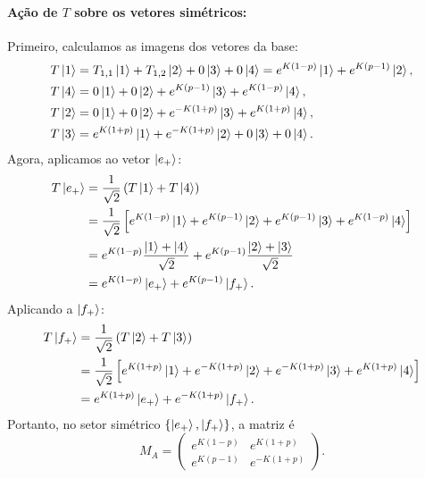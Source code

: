 \documentclass[11pt,a4paper]{article}
\begin{document}
\paragraph{Ação de \(T\) sobre os vetores simétricos:}
%
Primeiro, calculamos as imagens dos vetores da base:
%
\begin{align}
    T\ket{1} &= T_{1,1}\ket{1} + T_{1,2}\ket{2} + 0\ket{3} + 0\ket{4}
    = e^{K(1-p)}\ket{1} + e^{K(p-1)}\ket{2}, \\
    T\ket{4} &= 0\ket{1} + 0\ket{2} + e^{K(p-1)}\ket{3} + e^{K(1-p)}\ket{4}, \\
    T\ket{2} &= 0\ket{1} + 0\ket{2} + e^{-K(1+p)}\ket{3} + e^{K(1+p)}\ket{4}, \\
    T\ket{3} &= e^{K(1+p)}\ket{1} + e^{-K(1+p)}\ket{2} + 0\ket{3} + 0\ket{4}.
\end{align}
%
Agora, aplicamos ao vetor \(\ket{e_+}\):
%
\begin{align}
    T\ket{e_+} &= \frac{1}{\sqrt{2}} \left( T\ket{1} + T\ket{4} \right) \\
    &= \frac{1}{\sqrt{2}} \left[ e^{K(1-p)}\ket{1} + e^{K(p-1)}\ket{2} + e^{K(p-1)}\ket{3} + e^{K(1-p)}\ket{4} \right] \\
    &= e^{K(1-p)} \frac{\ket{1} + \ket{4}}{\sqrt{2}} + e^{K(p-1)} \frac{\ket{2} + \ket{3}}{\sqrt{2}} \\
    &= e^{K(1-p)} \ket{e_+} + e^{K(p-1)} \ket{f_+}.
\end{align}
%
Aplicando a \(\ket{f_+}\):
\begin{align}
    T\ket{f_+} &= \frac{1}{\sqrt{2}} \left( T\ket{2} + T\ket{3} \right) \\
    &= \frac{1}{\sqrt{2}} \left[ e^{K(1+p)}\ket{1} + e^{-K(1+p)}\ket{2} + e^{-K(1+p)}\ket{3} + e^{K(1+p)}\ket{4} \right] \\
    &= e^{K(1+p)} \ket{e_+} + e^{-K(1+p)} \ket{f_+}.
\end{align}
%
Portanto, no setor simétrico \(\{ \ket{e_+}, \ket{f_+} \}\), a matriz é
%
\begin{equation}
    M_A =
    \begin{pmatrix}
        e^{K(1-p)} & e^{K(1+p)} \\
        e^{K(p-1)} & e^{-K(1+p)}
    \end{pmatrix}.
    \label{eq:MA}
\end{equation}
%
\end{document}
